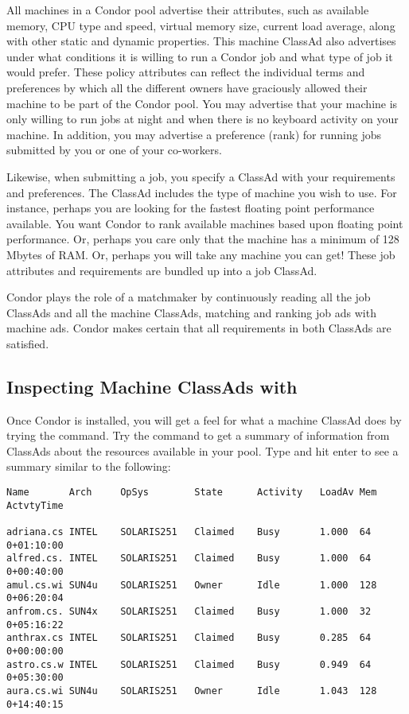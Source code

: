 All machines in a Condor pool advertise their attributes,
such as
available memory, CPU type and speed, virtual memory size, current
load average, along with other static and dynamic properties.
This machine ClassAd
also advertises under what conditions it is
willing to run a Condor job and what type of job it would prefer. These
policy attributes can reflect the individual terms and preferences by
which all the different owners have graciously allowed their machine to
be part of the Condor pool. 
You may
advertise that your machine is only willing to run jobs at night
and when there is no keyboard activity on your machine.
In addition, you may
advertise a preference (rank) for running jobs submitted by you
or one of your co-workers. 

Likewise, when submitting a job, you specify a ClassAd with
your requirements and preferences.
The ClassAd
includes the
type of machine you  wish to use. For instance, perhaps you are
looking for the fastest floating point performance available.
You want Condor to rank available machines
based upon floating point performance. Or, perhaps you
care only that the machine has a minimum of 128 Mbytes of RAM.
Or, perhaps you will
take any machine you can get! These job attributes and requirements
are bundled up into a job ClassAd.

Condor plays the role of a matchmaker by continuously reading
all the job ClassAds and all the machine ClassAds, 
matching and ranking job ads with machine ads.
Condor makes certain that all
requirements in both ClassAds are satisfied. 

\subsection{Inspecting Machine ClassAds with }

Once Condor is installed,
you will get a feel for what
a machine ClassAd does by trying
the  command.
Try the  command to get
a summary of information from
ClassAds about the resources available in your pool.
Type  and hit enter to see a summary 
similar to the following:
\begin{center}
\footnotesize
\begin{verbatim}
Name       Arch     OpSys        State      Activity   LoadAv Mem  ActvtyTime

adriana.cs INTEL    SOLARIS251   Claimed    Busy       1.000  64    0+01:10:00
alfred.cs. INTEL    SOLARIS251   Claimed    Busy       1.000  64    0+00:40:00
amul.cs.wi SUN4u    SOLARIS251   Owner      Idle       1.000  128   0+06:20:04
anfrom.cs. SUN4x    SOLARIS251   Claimed    Busy       1.000  32    0+05:16:22
anthrax.cs INTEL    SOLARIS251   Claimed    Busy       0.285  64    0+00:00:00
astro.cs.w INTEL    SOLARIS251   Claimed    Busy       0.949  64    0+05:30:00
aura.cs.wi SUN4u    SOLARIS251   Owner      Idle       1.043  128   0+14:40:15
\end{verbatim}
\normalsize
\Dots 
\end{center}


